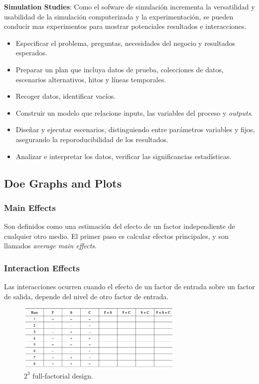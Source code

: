 \documentclass[]{article}
\begin{document}
\textbf{Simulation Studies}: Como el sofware de simulación incrementa la versatilidad y usabilidad de la simulación computerizada y la experimentación, se pueden conducir mas experimentos para mostrar potenciales resultados e interacciones. 

\begin{itemize}
	\item Especificar el problema, preguntas, necesidades del negocio y resultados esperados.
	\item Preparar un plan que incluya datos de prueba, colecciones de datos, escenarios alternativos, hitos y líneas temporales.
	\item Recoger datos, identificar vacíos.
	\item Construir un modelo que relacione inputs, las variables del proceso y \textit{outputs}.
	\item Diseñar y ejecutar escenarios, distinguiendo entre parámetros variables y fijos, asegurando la reporoducibilidad de los resultados.
	\item Analizar e interpretar los datos, verificar las significancias estadísticas.
\end{itemize}

\subsection{Doe Graphs and Plots}
\subsubsection{Main Effects}
Son definidos como una estimación del efecto de un factor independiente de cualquier otro medio. El primer paso es calcular efectos principales, y son llamados \textit{average main effects}.

\subsubsection{Interaction Effects}
Las interacciones ocurren cuando el efecto de un factor de entrada sobre un factor de salida, depende del nivel de otro factor de entrada.

\begin{figure}[H]
	\centering
	\includegraphics[width=80mm]{imagenes/a23design.png}
	\caption{$2^3$ full-factorial design.}
	\label{fig:A23design}
\end{figure}
\end{document}
